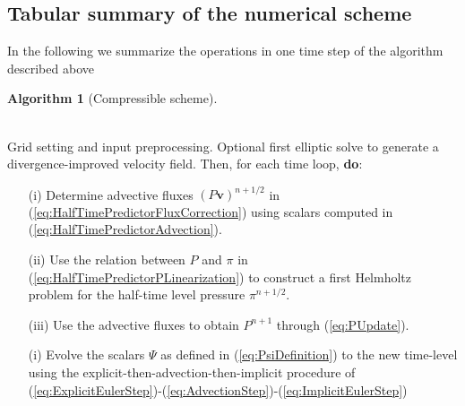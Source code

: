 \documentclass{ametsoc}
\theoremstyle{definition}
\newtheorem{algorithm}{Algorithm}
\newcommand{\eq}[1]{(\ref{#1})}
\newcommand{\vect}[1]{{\mathbf{#1}}}
\newcommand{\vv}{\vect{v}}
\newenvironment{falgorithm}
  {\begin{mdframed}\begin{algorithm}}
  {\end{algorithm}\end{mdframed}}
\begin{document}
\subsection{Tabular summary of the numerical scheme}

In the following we summarize the operations in one time step of the algorithm described above%

\vspace{2 mm}

\newpage

\begin{falgorithm}[Compressible scheme]
\ \\
\begin{description}
%
\vspace{-2mm}

\item[\emph{Initialization}]\ \\ Grid setting and input preprocessing. Optional first elliptic solve to generate a divergence-improved velocity field. Then, for each time loop, \textbf{do}:
%
\item[\emph{First stage}]
%
  \begin{enumerate}\item[]
    \item[(i)] Determine advective fluxes $(P\vv)^{n+1/2}$ in \eq{eq:HalfTimePredictorFluxCorrection} using scalars computed in \eq{eq:HalfTimePredictorAdvection}.  

    \item[(ii)] Use the relation between $P$ and $\pi$ in \eq{eq:HalfTimePredictorPLinearization} to construct a first Helmholtz problem for the half-time level pressure $\pi^{n+1/2}$.

    \item[(iii)] Use the advective fluxes to obtain $P^{n+1}$ through \eq{eq:PUpdate}.

  \end{enumerate}

\item[\emph{Second stage - scalars update}]
%
  \begin{enumerate}\item[]
    \item[(i)] Evolve the scalars $\Psi$ as defined in \eq{eq:PsiDefinition} to the new time-level using the explicit-then-advection-then-implicit procedure of \eq{eq:ExplicitEulerStep}-\eq{eq:AdvectionStep}-\eq{eq:ImplicitEulerStep}


\end{enumerate}
\end{description}
\end{falgorithm}
\end{document}
